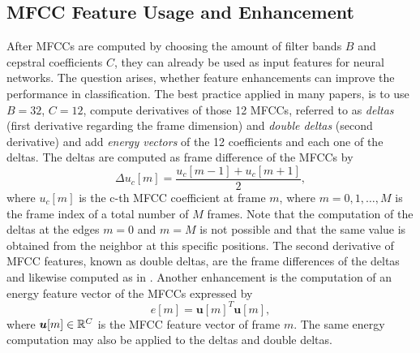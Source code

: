 
\subsection{MFCC Feature Usage and Enhancement}\label{sec:signal_mfcc_enhancement}
After MFCCs are computed by choosing the amount of filter bands $B$ and cepstral coefficients $C$, they can already be used as input features for neural networks.
The question arises, whether feature enhancements can improve the performance in classification.
The best practice applied in many papers, is to use $B=32$, $C=12$, compute derivatives of those 12 MFCCs, referred to as \emph{deltas} (first derivative regarding the frame dimension) and \emph{double deltas} (second derivative) and add \emph{energy vectors} of the 12 coefficients and each one of the deltas.
The deltas are computed as frame difference of the MFCCs by
\begin{equation}\label{eq:signal_mfcc_delta}
  \Delta u_c[m] = \frac{u_c[m - 1] + u_c[m + 1]}{2},
\end{equation}
where $u_c[m]$ is the c-th MFCC coefficient at frame $m$, where $m = 0, 1, \dots, M$ is the frame index of a total number of $M$ frames.
Note that the computation of the deltas at the edges $m=0$ and $m=M$ is not possible and that the same value is obtained from the neighbor at this specific positions.
The second derivative of MFCC features, known as double deltas, are the frame differences of the deltas and likewise computed as in .
Another enhancement is the computation of an energy feature vector of the MFCCs expressed by
\begin{equation}
  e[m] = \bm{u}[m]^T \bm{u}[m],
\end{equation}
where $\bm{u}[m] \in \mathbb{R}^C$ is the MFCC feature vector of frame $m$.
The same energy computation may also be applied to the deltas and double deltas.

